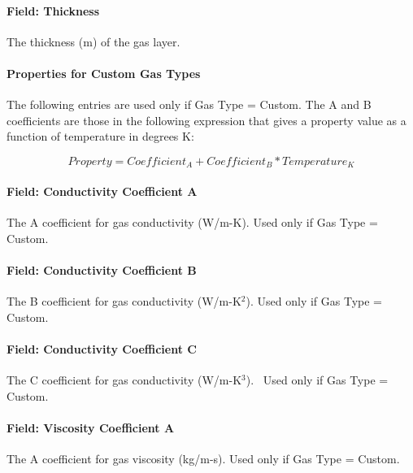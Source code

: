 \paragraph{Field: Thickness}\label{field-thickness-3}

The thickness (m) of the gas layer.

\paragraph{Properties for Custom Gas Types}\label{properties-for-custom-gas-types}

The following entries are used only if Gas Type = Custom. The A and B coefficients are those in the following expression that gives a property value as a function of temperature in degrees K:

\begin{equation}
Property = Coefficien{t_A} + Coefficien{t_B}*Temperatur{e_K}
\end{equation}

\paragraph{Field: Conductivity Coefficient A}\label{field-conductivity-coefficient-a}

The A coefficient for gas conductivity (W/m-K). Used only if Gas Type = Custom.

\paragraph{Field: Conductivity Coefficient B}\label{field-conductivity-coefficient-b}

The B coefficient for gas conductivity (W/m-K\(^{2}\)). Used only if Gas Type = Custom.

\paragraph{Field: Conductivity Coefficient C}\label{field-conductivity-coefficient-c}

The C coefficient for gas conductivity (W/m-K\(^{3}\)).~ Used only if Gas Type = Custom.

\paragraph{Field: Viscosity Coefficient A}\label{field-viscosity-coefficient-a}

The A coefficient for gas viscosity (kg/m-s). Used only if Gas Type = Custom.

